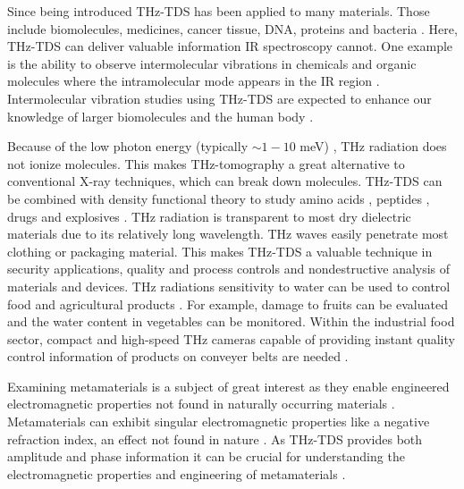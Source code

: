 Since being introduced THz-TDS has been applied to many materials. Those include biomolecules, medicines, cancer tissue, DNA, proteins and bacteria \cite{chenLargeOxidationDependence2005,waltherNoncovalentIntermolecularForces2003,fischerTerahertzTimedomainSpectroscopy2005}. Here, THz-TDS can deliver valuable information IR spectroscopy cannot. One example is the ability to observe intermolecular vibrations in chemicals and organic molecules where the intramolecular mode appears in the IR region \cite{nagaiDirectEvidenceIntermolecular2005}. Intermolecular vibration studies using THz-TDS are expected to enhance our knowledge of larger biomolecules and the human body \cite{tonouchiCuttingedgeTerahertzTechnology2007}. 

Because of the low photon energy (typically $\sim 1-10$ \si{\milli \electronvolt}) \cite{yangBiomedicalApplicationsTerahertz2016}, THz radiation does not ionize molecules. This makes THz-tomography a great alternative to conventional X-ray techniques, which can break down molecules. THz-TDS can be combined with density functional theory \cite{chenCombinationTerahertzSpectroscopy2022} to study amino acids \cite{liaoAminoacidClassificationBased2023}, peptides \cite{neuTerahertzSpectroscopyTetrameric2019}, drugs \cite{kawaseNondestructiveTerahertzImaging2003} and explosives \cite{daviesTerahertzSpectroscopyExplosives2008}. THz radiation is transparent to most dry dielectric materials due to its relatively long wavelength. THz waves easily penetrate most clothing \cite{prokschaTerahertzInsightsFabric2024} or packaging \cite{wietzkeTerahertzSpectroscopyPolymers2011} material. This makes THz-TDS a valuable technique in security applications, quality and process controls and nondestructive analysis of materials and devices. THz radiations sensitivity to water can be used to control food and agricultural products \cite{afsah-hejriTerahertzSpectroscopyImaging2020}. For example, damage to fruits can be evaluated and the water content in vegetables can be monitored. Within the industrial food sector, compact and high-speed THz cameras capable of providing instant quality control information of products on conveyer belts are needed \cite{THzSecurityApplications}. 

Examining metamaterials is a subject of great interest as they enable engineered electromagnetic properties not found in naturally occurring materials \cite{lakamanahalliMetamaterialsComprehensiveReview2024}. Metamaterials can exhibit singular electromagnetic properties like a negative refraction index, an effect not found in nature \cite{ramakrishnaPhysicsApplicationsNegative2008}. As THz-TDS provides both amplitude and phase information it can be crucial for understanding the electromagnetic properties and engineering of metamaterials \cite{rouxPrinciplesApplicationsTHz2014}. 

